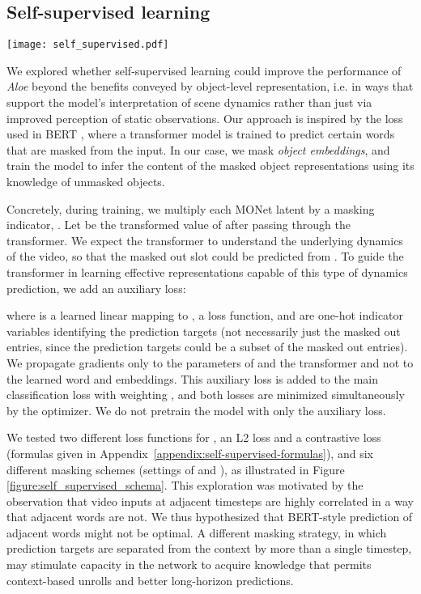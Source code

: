 \documentclass{article}
\newcommand{\Model}{\emph{Aloe}}
\begin{document}
\subsection{Self-supervised learning}

\begin{figure*}[t]
    \centering
    \texttt{[image: self\_supervised.pdf]}
    \caption{\label{figure:self_supervised_schema} Different masking schemes for self-supervised learning applied to \Model{}.
    }
\end{figure*}


We explored whether self-supervised learning could improve the performance of \Model{} beyond the benefits conveyed by object-level representation,
i.e. in ways that support the model's interpretation of scene dynamics rather than just via improved perception of static observations. Our approach is inspired by the loss used in BERT \citep{devlin2018bert}, where a transformer model is trained to predict certain words that are masked from the input. In our case, we mask \emph{object embeddings}, and train the model to infer the content of the masked object representations using its knowledge of unmasked objects.

Concretely, during training, we multiply each MONet latent  by
a masking indicator, .
Let  be the transformed value of  after passing through the transformer.
We expect the transformer to understand the underlying dynamics of the video,
so that the masked out slot  could be predicted from .
To guide the transformer in learning effective representations
capable of this type of dynamics prediction, we add an auxiliary loss:

where  is a learned linear mapping to ,  a loss function, and  are one-hot indicator variables
identifying the prediction targets (not necessarily just the masked out entries, since the prediction targets could be a subset
of the masked out entries).
We propagate gradients only to 
the parameters of  and the transformer
and not to the learned word and  embeddings.
This auxiliary loss is added to the main classification loss with weighting ,
and both losses are minimized simultaneously by the optimizer.
We do not pretrain the model with only the auxiliary loss.

We tested two different loss functions for , an L2 loss
and a contrastive loss (formulas given in Appendix~\ref{appendix:self-supervised-formulas}),
and six different masking schemes (settings of  and ), as illustrated in Figure \ref{figure:self_supervised_schema}.
This exploration was motivated by the observation that video inputs at adjacent timesteps are highly correlated in a way that adjacent words are not.
We thus hypothesized that BERT-style prediction of adjacent words might not be optimal.
A different masking strategy, in which prediction targets are separated from the context by more than a single timestep,
may stimulate capacity in the network to acquire knowledge that permits context-based unrolls and better long-horizon predictions. 
\end{document}
